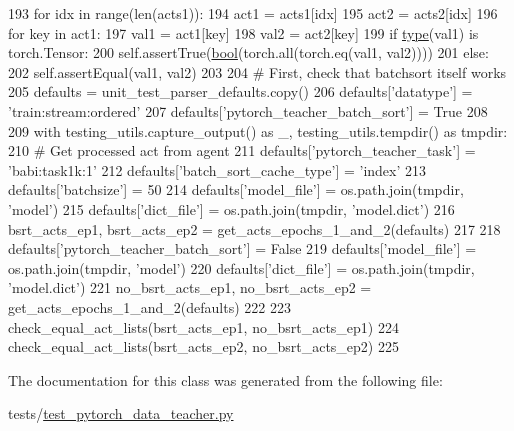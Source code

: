 \begin{DoxyCode}
193             \textcolor{keywordflow}{for} idx \textcolor{keywordflow}{in} range(len(acts1)):
194                 act1 = acts1[idx]
195                 act2 = acts2[idx]
196                 \textcolor{keywordflow}{for} key \textcolor{keywordflow}{in} act1:
197                     val1 = act1[key]
198                     val2 = act2[key]
199                     \textcolor{keywordflow}{if} \hyperlink{namespaceparlai_1_1agents_1_1tfidf__retriever_1_1build__tfidf_ad5dfae268e23f506da084a9efb72f619}{type}(val1) \textcolor{keywordflow}{is} torch.Tensor:
200                         self.assertTrue(\hyperlink{namespaceprojects_1_1mastering__the__dungeon_1_1mturk_1_1tasks_1_1MTD_1_1run_a6fc0c9b519a36f82b65bcd398f1fbb9d}{bool}(torch.all(torch.eq(val1, val2))))
201                     \textcolor{keywordflow}{else}:
202                         self.assertEqual(val1, val2)
203 
204         \textcolor{comment}{# First, check that batchsort itself works}
205         defaults = unit\_test\_parser\_defaults.copy()
206         defaults[\textcolor{stringliteral}{'datatype'}] = \textcolor{stringliteral}{'train:stream:ordered'}
207         defaults[\textcolor{stringliteral}{'pytorch\_teacher\_batch\_sort'}] = \textcolor{keyword}{True}
208 
209         with testing\_utils.capture\_output() \textcolor{keyword}{as} \_, testing\_utils.tempdir() \textcolor{keyword}{as} tmpdir:
210             \textcolor{comment}{# Get processed act from agent}
211             defaults[\textcolor{stringliteral}{'pytorch\_teacher\_task'}] = \textcolor{stringliteral}{'babi:task1k:1'}
212             defaults[\textcolor{stringliteral}{'batch\_sort\_cache\_type'}] = \textcolor{stringliteral}{'index'}
213             defaults[\textcolor{stringliteral}{'batchsize'}] = 50
214             defaults[\textcolor{stringliteral}{'model\_file'}] = os.path.join(tmpdir, \textcolor{stringliteral}{'model'})
215             defaults[\textcolor{stringliteral}{'dict\_file'}] = os.path.join(tmpdir, \textcolor{stringliteral}{'model.dict'})
216             bsrt\_acts\_ep1, bsrt\_acts\_ep2 = get\_acts\_epochs\_1\_and\_2(defaults)
217 
218             defaults[\textcolor{stringliteral}{'pytorch\_teacher\_batch\_sort'}] = \textcolor{keyword}{False}
219             defaults[\textcolor{stringliteral}{'model\_file'}] = os.path.join(tmpdir, \textcolor{stringliteral}{'model'})
220             defaults[\textcolor{stringliteral}{'dict\_file'}] = os.path.join(tmpdir, \textcolor{stringliteral}{'model.dict'})
221             no\_bsrt\_acts\_ep1, no\_bsrt\_acts\_ep2 = get\_acts\_epochs\_1\_and\_2(defaults)
222 
223         check\_equal\_act\_lists(bsrt\_acts\_ep1, no\_bsrt\_acts\_ep1)
224         check\_equal\_act\_lists(bsrt\_acts\_ep2, no\_bsrt\_acts\_ep2)
225 
\end{DoxyCode}


The documentation for this class was generated from the following file\+:\begin{DoxyCompactItemize}
\item 
tests/\hyperlink{test__pytorch__data__teacher_8py}{test\+\_\+pytorch\+\_\+data\+\_\+teacher.\+py}\end{DoxyCompactItemize}
